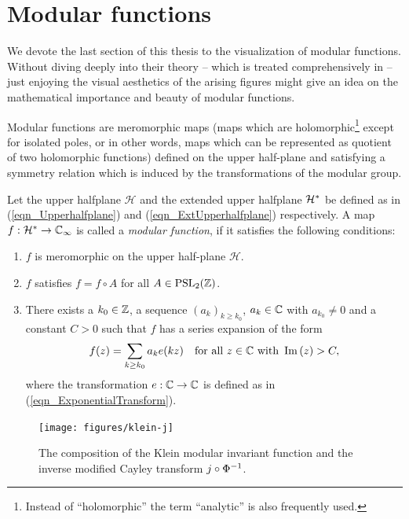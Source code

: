 \section{Modular functions}

We devote the last section of this thesis to the visualization of modular functions. Without diving deeply into their theory -- which is treated  comprehensively in \Schoeneberg{} -- just enjoying the visual aesthetics of the arising figures might give an idea on the mathematical importance and beauty of modular functions.

Modular functions are meromorphic maps (\ie maps which are holomorphic\footnote{Instead of ``holomorphic'' the term ``analytic'' is also frequently used.} except for isolated poles, or in other words, maps which can be represented as quotient of two holomorphic functions) defined on the upper half-plane and satisfying a symmetry relation which is induced by the transformations of the modular group.

\begin{definition}
Let the upper halfplane $\mathcal{H}$ and the extended upper halfplane $\mathcal{H}^\ast$ be defined as in (\ref{eqn_Upperhalfplane}) and (\ref{eqn_ExtUpperhalfplane}) respectively.
A map $f : \mathcal{H}^\ast \to \mathbb{C}_{\infty}$ is called a \emph{modular function}, if it satisfies the following conditions:
\begin{enumerate}[\quad(i)]
\item $f$ is meromorphic on the upper half-plane $\mathcal{H}$.
\item $f$ satisfies $f = f \circ A$ for all $A \in \operatorname{PSL}_{2}(\mathbb{Z})$.
\item There exists a $k_0 \in \mathbb{Z}$, a sequence $(a_k)_{k \ge k_0}$, $a_k \in \mathbb{C}$ with $a_{k_0} \ne 0$ and a constant $C > 0$ such that $f$ has a series expansion of the form
\begin{equation*}
f(z) = \sum_{k \ge k_0} a_k e(k z) \quad \text{for all } z \in \mathbb{C} \text{ with } \operatorname{Im}\left(z\right) > C,
\end{equation*}
where the transformation $e : \mathbb{C} \to \mathbb{C}$ is defined as in (\ref{eqn_ExponentialTransform}).
\end{enumerate}
\end{definition}

\begin{figure}
\centering
\texttt{[image: figures/klein-j]}
\caption{The composition of the Klein modular invariant function and the inverse modified Cayley transform $j \circ {\Phi}^{-1}$.}
\label{fig_KleinJ}
\end{figure}

